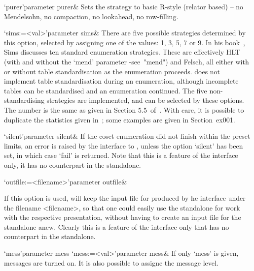     \>`purer'{parameter purer}&
    Sets the strategy  to basic R-style (relator based)  -- no Mendelsohn,
    no compaction, no lookahead, no row-filling.

    \>`sims:=<val>'{parameter sims}&
    There are five possible strategies determined by this option, selected
by assigning one of the values: 1, 3, 5, 7 or 9.
In  his  book~\cite{Sim},  Sims discusses  ten  standard  enumeration
strategies.  These  are effectively HLT  (with and without  the `mend'
parameter -see~"mend")  and Felsch, all  either with or  without table
standardisation as the enumeration proceeds.
{\ACE} does not implement table standardisation during an enumeration,
although  incomplete tables  can  be standardised  and an  enumeration
continued.
The  five non-standardising  strategies  are implemented,  and can  be
selected by these options.  The number is the same as given in Section
5.5~of~\cite{Sim}.   With  care,  it  is  possible  to  duplicate  the
statistics   given  in~\cite{Sim};  some   examples  are   given  in
Section~{ex001}.





\beginitems

\>`silent'{parameter silent}& If the  coset enumeration did not finish
within  the preset  limits, an  error is  raised by  the  interface to
{\GAP}, unless the option `silent'  has been set, in which case `fail'
is  returned.  Note that  this is  a feature  of the  {\GAP} interface
only, it has no counterpart in the {\ACE} standalone.

\>`outfile:=<filename>'{parameter outfile}&

If this  option is used,  {\GAP} will keep  the input file  for {\ACE}
produced by he {\GAP} interface under the filename <filename>, so that
one  could  easily  use  the  {\ACE}  standalone  for  work  with  the
respective presentation,  without having to  create an input  file for
the standalone anew.  Clearly this is a feature  of the interface only
that has no counterpart in the {\ACE} standalone.

\>`mess'{parameter mess}
\>`mess:=<val>'{parameter mess}&
If only `mess' is given, messages are turned on. It is also possible to
assigne the message level.

